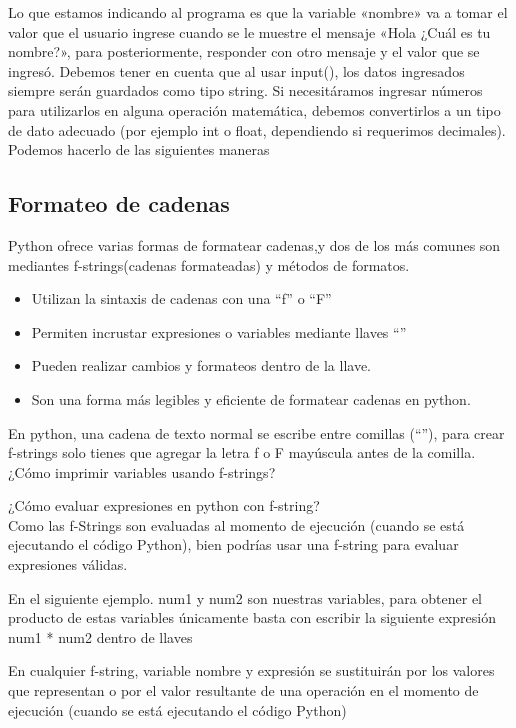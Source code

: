 Lo que estamos indicando al programa es que la variable «nombre» va a tomar el valor que el usuario ingrese cuando se le muestre el mensaje «Hola ¿Cuál es tu nombre?», para posteriormente, responder con otro mensaje y el valor que se ingresó. Debemos tener en cuenta que al usar input(), los datos ingresados siempre serán guardados como tipo string. Si necesitáramos ingresar números para utilizarlos en alguna operación matemática, debemos convertirlos a un tipo de dato adecuado (por ejemplo int o float, dependiendo si requerimos decimales). Podemos hacerlo de las siguientes maneras

\subsection{Formateo de cadenas}

Python ofrece varias formas de formatear cadenas,y dos de los más comunes son mediantes f-strings(cadenas formateadas) y métodos de formatos.
\begin{itemize}
    \item Utilizan la sintaxis de cadenas con una “f” o “F” 
    \item Permiten incrustar expresiones o variables mediante llaves ``{}''
    \item Pueden realizar cambios y formateos dentro de la llave.
    \item Son una forma más legibles y eficiente de formatear cadenas en python.
\end{itemize}

En python, una cadena de texto normal se escribe entre comillas (``''), para crear f-strings solo tienes que agregar la letra f o F mayúscula antes de la comilla.\\

¿Cómo imprimir variables usando f-strings?

¿Cómo evaluar expresiones en python con f-string?\\

Como las f-Strings son evaluadas al momento de ejecución (cuando se está ejecutando el código Python), bien podrías usar una f-string para evaluar expresiones válidas.

En el siguiente ejemplo. num1 y num2 son nuestras variables, para obtener el producto de estas variables únicamente basta con escribir la siguiente expresión num1 * num2 dentro de llaves

En cualquier f-string,  {variable nombre} y {expresión} se sustituirán  por los valores que representan  o por el valor resultante de una operación en el momento de ejecución (cuando se está ejecutando el código Python)
